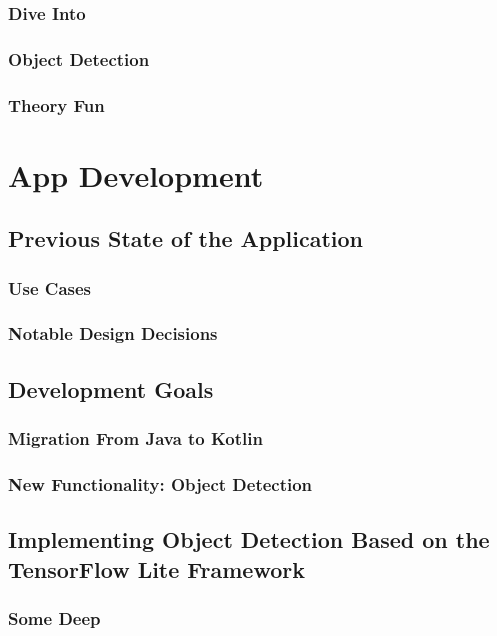 \documentclass[11pt,
               a4paper,
               bibtotoc,
               idxtotoc,
               headsepline,
               footsepline,
               footexclude,
               BCOR12mm,
               DIV13,
               openany,   %
               ]
               {scrbook}
\begin{document}
\section{Dive Into}
\section{Object Detection}
\section{Theory Fun}

\part{App Development}

\chapter{Previous State of the Application}

\section{Use Cases}

\section{Notable Design Decisions}

\chapter{Development Goals}

\section{Migration From Java to Kotlin}

\section{New Functionality: Object Detection}

\chapter{Implementing Object Detection Based on the TensorFlow Lite Framework}

\section{Some Deep}
\end{document}
